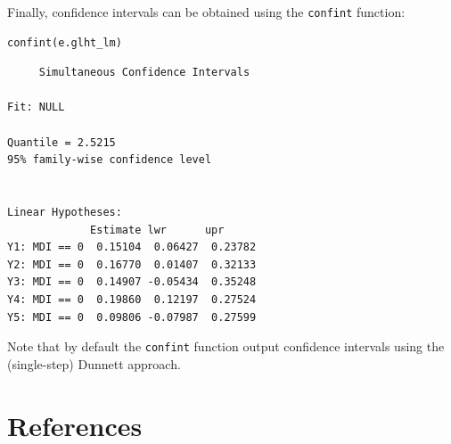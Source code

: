 \documentclass[12pt]{article}
\begin{document}
Finally, confidence intervals can be obtained using the \texttt{confint}
function:
\lstset{language=r,label= ,caption= ,captionpos=b,numbers=none}
\begin{lstlisting}
confint(e.glht_lm)
\end{lstlisting}

\begin{verbatim}
	 Simultaneous Confidence Intervals

Fit: NULL

Quantile = 2.5215
95% family-wise confidence level
 

Linear Hypotheses:
             Estimate lwr      upr     
Y1: MDI == 0  0.15104  0.06427  0.23782
Y2: MDI == 0  0.16770  0.01407  0.32133
Y3: MDI == 0  0.14907 -0.05434  0.35248
Y4: MDI == 0  0.19860  0.12197  0.27524
Y5: MDI == 0  0.09806 -0.07987  0.27599
\end{verbatim}
Note that by default the \texttt{confint} function output confidence
intervals using the (single-step) Dunnett approach.


\clearpage

\section{References}
\label{sec:org17b2da9}

\begingroup
\renewcommand{\section}[2]{}

 
\endgroup
\end{document}
